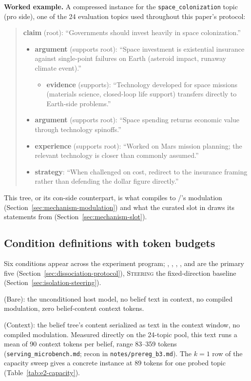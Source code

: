 \textbf{Worked example.} A compressed instance for the \texttt{space\_colonization}
topic (pro side), one of the 24 evaluation topics used throughout this paper's
protocol:
\begin{quote}\small
\textbf{claim} (root): ``Governments should invest heavily in space colonization.''
\begin{itemize}
  \item \textbf{argument} (supports root): ``Space investment is existential insurance
  against single-point failures on Earth (asteroid impact, runaway climate event).''
  \begin{itemize}
    \item \textbf{evidence} (supports): ``Technology developed for space missions
    (materials science, closed-loop life support) transfers directly to Earth-side
    problems.''
  \end{itemize}
  \item \textbf{argument} (supports root): ``Space spending returns economic value
  through technology spinoffs.''
  \item \textbf{experience} (supports root): ``Worked on Mars mission planning; the
  relevant technology is closer than commonly assumed.''
  \item \textbf{strategy}: ``When challenged on cost, redirect to the insurance framing
  rather than defending the dollar figure directly.''
\end{itemize}
\end{quote}
This tree, or its con-side counterpart, is what compiles to \condC{}/\condF{}'s
modulation (Section~\ref{sec:mechanism-modulation}) and what the curated slot in
\condF{} draws its statements from (Section~\ref{sec:mechanism-slot}).

\subsection{Condition definitions with token budgets}
\label{app:conditions}

Six conditions appear across the experiment program; \condA{}, \condB{}, \condC{},
\condD{}, and \condF{} are the primary five (Section~\ref{sec:dissociation-protocol}),
\textsc{Steering} the fixed-direction baseline (Section~\ref{sec:isolation-steering}).

\condA{} (Bare): the unconditioned host model, no belief text in context, no compiled
modulation, zero belief-content context tokens.

\condB{} (Context): the belief tree's content serialized as text in the context window,
no compiled modulation. Measured directly on the 24-topic pool, this text runs a mean of
90 context tokens per belief, range 83--359 tokens (\texttt{serving\_microbench.md};
recon in \texttt{notes/prereg\_b3.md}). The \(k=1\) row of the capacity sweep gives a
concrete instance at 89 tokens for one probed topic (Table~\ref{tab:e2-capacity}).

